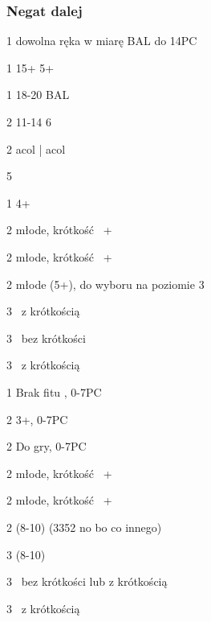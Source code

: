 \documentclass[12pt, a4paper]{article}
\begin{document}
\subsubsection*{Negat dalej}
\sequence{{1\clubs}{1\diams}}
\begin{options}[1]
    \item[1\hearts] dowolna ręka w miarę BAL do 14PC \vimp
    \item[1\spades] 15+ 5+\clubs \vimp
    \item[1\nt] 18-20 BAL
    \item[2\clubs] 11-14 6\clubs  
    \item[2\diams] acol \clubs | acol \clubs\diams \imp
\end{options}

\sequence{{1\clubs}{1\diams}{1\hearts}}
\begin{options}[2]
    \item[\pass] 5\hearts
    \item[1\spades] 4+\spades 
    \item[2\hearts] młode, krótkość \hearts\ \inv+
    \item[2\spades] młode, krótkość \spades\ \inv+
    \item[2\nt] młode (5+\clubs), do wyboru na poziomie 3
    \item[3\clubs] \gf\ \diams z krótkością \clubs
    \item[3\diams] \gf\ \diams bez krótkości
    \item[3\major] \gf\ \diams z krótkością   
\end{options}

\sequence{{1\clubs}{1\diams}{1\spades}}
\begin{options}[2]
    \item[1\nt] Brak fitu \clubs, 0-7PC
    \item[2\clubs] 3+\clubs, 0-7PC
    \item[2\diams] Do gry, 0-7PC
    \item[2\hearts] młode, krótkość \hearts\ \inv+
    \item[2\spades] młode, krótkość \spades\ \inv+
    \item[2\nt] \inv (8-10) (3352 no bo co innego)
    \item[3\clubs] \inv (8-10)  
    \item[3\diams] \gf\ \diams bez krótkości lub z krótkością \clubs
    \item[3\major] \gf\ \diams z krótkością 
\end{options}
\end{document}
